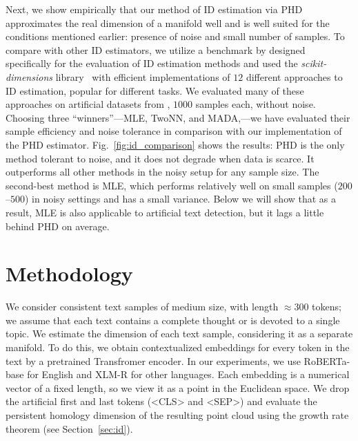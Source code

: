 \documentclass{article}
\begin{document}
Next, we show empirically that our method of ID estimation via PHD approximates the real dimension of a manifold well and is well suited for the conditions mentioned earlier: presence of noise and small number of samples. To compare with other ID estimators, we utilize a benchmark by \citet{campadelli2015intrinsic} designed specifically for the evaluation of ID estimation methods and  
used the \textit{scikit-dimensions} library~\citep{bac2021scikit} with efficient implementations of $12$ different approaches to ID estimation, popular for different tasks. We evaluated many of these approaches on artificial datasets from \citet{bac2021scikit}, $1000$ samples each, without noise. Choosing three ``winners''---MLE, TwoNN, and MADA,---we have evaluated their sample efficiency and noise tolerance in comparison with our implementation of the PHD estimator. Fig.~\ref{fig:id_comparison} shows the results: PHD is the only method tolerant to noise, and it does not degrade when data is scarce. It outperforms all other methods in the noisy setup for any sample size. The second-best method is MLE, which performs relatively well on small samples ($200$--$500$) in noisy settings and has a small variance. Below we will show that as a result, MLE is also applicable to artificial text detection, but it lags a little behind PHD on average.    







\section{Methodology}
\label{sec:method}

We consider consistent text samples of medium size, with length $\approx 300$ tokens; we assume that each text contains a complete thought or is devoted to a single topic. We estimate the dimension of each text sample, considering it as a separate manifold. To do this, we obtain contextualized embeddings for every token in the text by a pretrained Transfromer encoder. In our experiments, we use RoBERTa-base \citep{liu2019roberta} for English and XLM-R \citep{goyal2021larger} for other languages. Each embedding is a numerical vector of a fixed length, so we view it as a point in the Euclidean space. We drop the artificial first and last tokens (<CLS> and <SEP>) and  
evaluate the persistent homology dimension of the resulting point cloud using the growth rate theorem (see Section~\ref{sec:id}).
\end{document}
